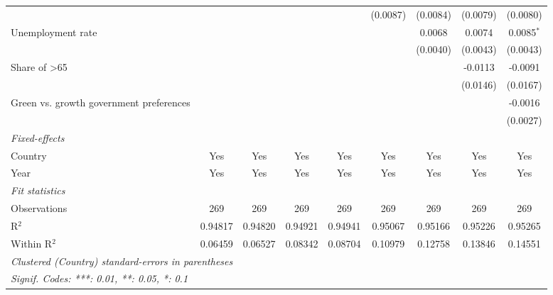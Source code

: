 \begin{table}[htbp]
\begin{tabular}{lcccccccc}
                                                         &               &               &               &               & (0.0087)      & (0.0084)      & (0.0079)      & (0.0080)\\   
      Unemployment rate                                  &               &               &               &               &               & 0.0068        & 0.0074        & 0.0085$^{*}$\\   
                                                         &               &               &               &               &               & (0.0040)      & (0.0043)      & (0.0043)\\   
      Share of >65                                       &               &               &               &               &               &               & -0.0113       & -0.0091\\   
                                                         &               &               &               &               &               &               & (0.0146)      & (0.0167)\\   
      Green vs. growth government preferences            &               &               &               &               &               &               &               & -0.0016\\   
                                                         &               &               &               &               &               &               &               & (0.0027)\\   
      \midrule
      \emph{Fixed-effects}\\
      Country                                            & Yes           & Yes           & Yes           & Yes           & Yes           & Yes           & Yes           & Yes\\  
      Year                                               & Yes           & Yes           & Yes           & Yes           & Yes           & Yes           & Yes           & Yes\\  
      \midrule
      \emph{Fit statistics}\\
      Observations                                       & 269           & 269           & 269           & 269           & 269           & 269           & 269           & 269\\  
      R$^2$                                              & 0.94817       & 0.94820       & 0.94921       & 0.94941       & 0.95067       & 0.95166       & 0.95226       & 0.95265\\  
      Within R$^2$                                       & 0.06459       & 0.06527       & 0.08342       & 0.08704       & 0.10979       & 0.12758       & 0.13846       & 0.14551\\  
      \midrule \midrule
      \multicolumn{9}{l}{\emph{Clustered (Country) standard-errors in parentheses}}\\
      \multicolumn{9}{l}{\emph{Signif. Codes: ***: 0.01, **: 0.05, *: 0.1}}\\
   \end{tabular}
\end{table}


